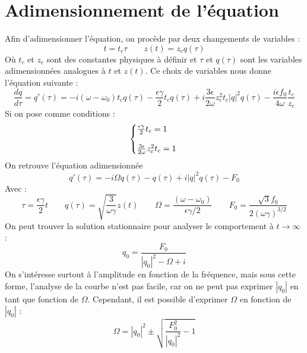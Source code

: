 \section{Adimensionnement de l'équation}
%
Afin d'adimensionner l'équation, on procède par deux changements de variables :
%
\begin{equation}
    t = t_c \tau
    \qquad 
    z(t) = z_c q(\tau)
\end{equation}
Où $t_c$ et $z_c$ sont des constantes physiques à définir et $\tau$ et $q(\tau)$ sont les variables adimensionnées analogues à $t$ et $z(t)$.
Ce choix de variables nous donne l'équation suivante :
%
\begin{equation}
    \frac{dq}{d\tau} = q'(\tau) = -i(\omega - \omega_0)t_c q(\tau) - \frac{\epsilon\gamma}{2}t_c q(\tau) + i \frac{3\epsilon}{2\omega}z_c^2t_c |q|^2q(\tau) - \frac{i\epsilon f_0}{4\omega}\frac{t_c}{z_c}
\end{equation}
%
Si on pose comme conditions :
%
\begin{equation}
    \left\{
    \begin{array}{@{}l@{}}
        \frac{\epsilon\gamma}{2}t_c = 1 \\
        \\
        \frac{3\epsilon}{2\omega}z_c^2t_c = 1
    \end{array}
    \right.\,
\end{equation}
%
On retrouve l'équation adimensionnée
%
\begin{equation}
    q'(\tau) = -i\Omega q(\tau) - q(\tau) + i|q|^2q(\tau) - F_0
\end{equation}
%
Avec :
%
\begin{equation}
    \tau = \frac{\epsilon\gamma}{2}t
    \qquad
    q(\tau) = \sqrt{\frac{3}{\omega\gamma}}z(t)
    \qquad
    \Omega = \frac{(\omega - \omega_0)}{\epsilon\gamma/2}
    \qquad
    F_0 = \frac{\sqrt{3}f_0}{2(\omega \gamma)^{3/2}}
\end{equation}
%
On peut trouver la solution stationnaire pour analyser le comportement à $t\to\infty$ :
%
\begin{equation}
    q_0 = \frac{F_0}{|q_0|^2 - \Omega + i}
    \label{eq:duff_stationnaire}
\end{equation}
%
On s'intéresse surtout à l'amplitude en fonction de la fréquence, 
mais sous cette forme, l'analyse de la courbe n'est pas facile, car on ne peut pas exprimer $|q_0|$ en tant que fonction de $\Omega$. 
Cependant, il est possible d'exprimer $\Omega$ en fonction de $|q_0|$ :
%
\begin{equation}
    \Omega = |q_0|^2 \pm \sqrt{\frac{F_0^2}{|q_0|^2} - 1 }
    \label{eq:duff_response}
\end{equation}
